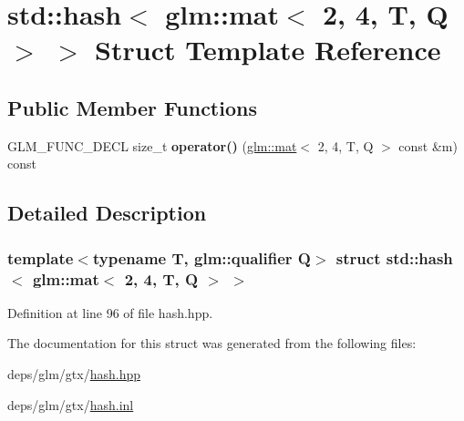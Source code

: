 \hypertarget{structstd_1_1hash_3_01glm_1_1mat_3_012_00_014_00_01T_00_01Q_01_4_01_4}{}\section{std\+:\+:hash$<$ glm\+:\+:mat$<$ 2, 4, T, Q $>$ $>$ Struct Template Reference}
\label{structstd_1_1hash_3_01glm_1_1mat_3_012_00_014_00_01T_00_01Q_01_4_01_4}
\subsection*{Public Member Functions}
\begin{DoxyCompactItemize}
\item 
\mbox{\label{structstd_1_1hash_3_01glm_1_1mat_3_012_00_014_00_01T_00_01Q_01_4_01_4_adf506e6d79598dae56b897c7d34e43be}} 
G\+L\+M\+\_\+\+F\+U\+N\+C\+\_\+\+D\+E\+CL size\+\_\+t {\bfseries operator()} (\hyperlink{structglm_1_1mat}{glm\+::mat}$<$ 2, 4, T, Q $>$ const \&m) const
\end{DoxyCompactItemize}


\subsection{Detailed Description}
\subsubsection*{template$<$typename T, glm\+::qualifier Q$>$\newline
struct std\+::hash$<$ glm\+::mat$<$ 2, 4, T, Q $>$ $>$}



Definition at line 96 of file hash.\+hpp.



The documentation for this struct was generated from the following files\+:\begin{DoxyCompactItemize}
\item 
deps/glm/gtx/\hyperlink{hash_8hpp}{hash.\+hpp}\item 
deps/glm/gtx/\hyperlink{hash_8inl}{hash.\+inl}\end{DoxyCompactItemize}
